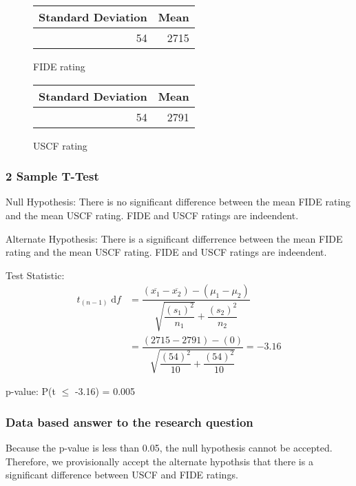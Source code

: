 \documentclass[12pt, titlepage]{article}
\begin{document}
\begin{figure}[H]
\centering
\begin{tabular}{rr}
Standard Deviation & Mean\\
\hline
54 & 2715\\
\end{tabular}
    \caption{FIDE rating}
\end{figure}

\begin{figure}[H]
  \centering
\begin{tabular}{rr}
Standard Deviation & Mean\\
\hline
54 & 2791\\
\end{tabular}
    \caption{USCF rating}
\end{figure}




\subsubsection{2 Sample T-Test}
Null Hypothesis: There is no significant difference between the mean FIDE rating and the mean USCF rating. FIDE and USCF ratings are indeendent.

Alternate Hypothesis: There is a significant differrence between the mean FIDE rating and the mean USCF rating. FIDE and USCF ratings are indeendent.

Test Statistic: 
\begin{equation*}
\begin{split}
    t_{(n-1)} \; \textrm{d}f & = \dfrac{(\overline{x_{1}} - \overline{x_{2}}) - (\mu_{1} - \mu_{2})}{\sqrt{\dfrac{(s_{1})^{2}}{n_{1}}} + \dfrac{(s_{2})^{2}}{n_{2}}} \\
    & = \dfrac{(2715-2791) - (0)}{\sqrt{\dfrac{(54)^{2}}{10} + \dfrac{(54)^{2}}{10}}} = -3.16
\end{split}
\end{equation*}

p-value: P(t \(\leq\) -3.16) = 0.005

\subsubsection{Data based answer to the research question}
Because the p-value is less than 0.05, the null hypothesis cannot be accepted. Therefore, we provisionally accept the alternate hypothsis that there is a significant difference between USCF and FIDE ratings.
\end{document}
